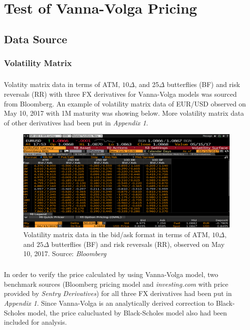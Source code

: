 \chapter{Test of Vanna-Volga Pricing}


\section{Data Source}
\subsection{Volatility Matrix}
\paragraph{}
Volatity matrix data in terms of ATM, $10\Delta$, and 25$\Delta$ butterflies (BF) and risk reversals (RR) with three FX derivatives for Vanna-Volga models was sourced from Bloomberg. An example of volatility matrix data of EUR/USD observed on May 10, 2017 with 1M maturity was showing below. More volatility matrix data of other derivatives had been put in \textit{Appendix 1}.

\begin{figure}[htb]
	\centering
	\includegraphics[scale=0.3]{./Testing-data/EURUSD.png} 
	\caption{Volatility matrix data in the bid/ask format in terms of ATM, $10\Delta$, and $25\Delta$ butterflies (BF) and risk reversals (RR), observed on May 10, 2017. Source: \textit{Bloomberg}}
	\label{fig:label} %
\end{figure}

\paragraph{}
In order to verify the price calculated by using Vanna-Volga model, two benchmark sources (Bloomberg pricing model and \textit{investing.com} with price provided by \textit{Sentry Derivatives}) for all three FX derivatives had been put in \textit{Appendix 1}. Since Vanna-Volga is an analytically derived correction to Black-Scholes model, the price calucluated by Black-Scholes model also had been included for analysis.


